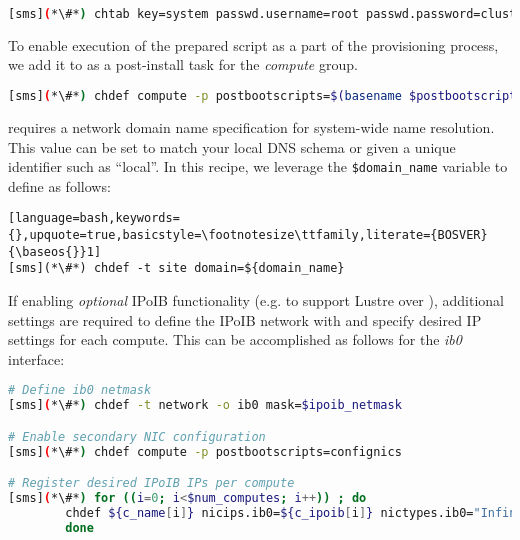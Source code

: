 \begin{lstlisting}[language=bash,keywords={},upquote=true,basicstyle=\footnotesize\ttfamily,]
[sms](*\#*) chtab key=system passwd.username=root passwd.password=cluster
\end{lstlisting}

\noindent To enable execution of the prepared script as a part of the provisioning process,
we add it to \xCAT{} as a post-install task for the {\em compute} group. 
\begin{lstlisting}[language=bash,keywords={},upquote=true,basicstyle=\footnotesize\ttfamily,]
[sms](*\#*) chdef compute -p postbootscripts=$(basename $postbootscript)
\end{lstlisting}
\fi

\noindent \xCAT{} requires a network domain name specification for system-wide name
resolution. This value can be set to match your local DNS schema or given a
unique identifier such as ``local''. In this recipe, we leverage the
\texttt{\$domain\_name} variable to define as follows:

\begin{lstlisting}[language=bash,keywords={},upquote=true,basicstyle=\footnotesize\ttfamily,literate={BOSVER}{\baseos{}}1]
[sms](*\#*) chdef -t site domain=${domain_name}
\end{lstlisting}

If enabling {\em optional} IPoIB functionality (e.g. to support Lustre over \InfiniBand{}), additional
settings are required to define the IPoIB network with \xCAT{} and specify
desired IP settings for each compute. This can be accomplished as follows for
the {\em ib0} interface:

\begin{lstlisting}[language=bash,keywords={},upquote=true,basicstyle=\footnotesize\ttfamily]
# Define ib0 netmask
[sms](*\#*) chdef -t network -o ib0 mask=$ipoib_netmask

# Enable secondary NIC configuration
[sms](*\#*) chdef compute -p postbootscripts=confignics

# Register desired IPoIB IPs per compute
[sms](*\#*) for ((i=0; i<$num_computes; i++)) ; do
		chdef ${c_name[i]} nicips.ib0=${c_ipoib[i]} nictypes.ib0="InfiniBand" nicnetworks.ib0=ib0
        done
\end{lstlisting}

